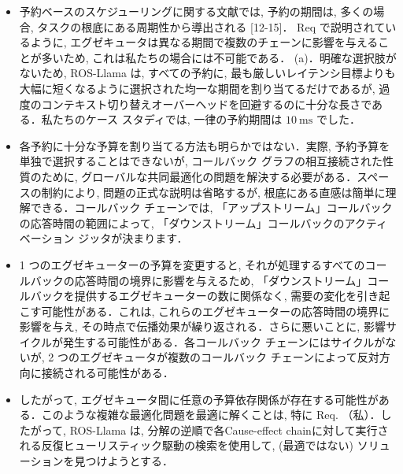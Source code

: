 \begin{frame}{}
    \begin{itemize}
        \item 予約ベースのスケジューリングに関する文献では, 予約の期間は, 多くの場合, タスクの根底にある周期性から導出される [12-15]． Req で説明されているように, エグゼキュータは異なる期間で複数のチェーンに影響を与えることが多いため, これは私たちの場合には不可能である． (a)．明確な選択肢がないため, ROS-Llama は, すべての予約に, 最も厳しいレイテンシ目標よりも大幅に短くなるように選択された均一な期間を割り当てるだけであるが, 過度のコンテキスト切り替えオーバーヘッドを回避するのに十分な長さである．私たちのケース スタディでは, 一律の予約期間は $10 \mathrm{~ms}$ でした．
    \end{itemize}
\end{frame}

\begin{frame}{}
    \begin{itemize}
        \item 各予約に十分な予算を割り当てる方法も明らかではない．実際, 予約予算を単独で選択することはできないが, コールバック グラフの相互接続された性質のために, グローバルな共同最適化の問題を解決する必要がある．スペースの制約により, 問題の正式な説明は省略するが, 根底にある直感は簡単に理解できる．コールバック チェーンでは, 「アップストリーム」コールバックの応答時間の範囲によって, 「ダウンストリーム」コールバックのアクティベーション ジッタが決まります．
    \end{itemize}
\end{frame}

\begin{frame}{}
    \begin{itemize}
        \item 1 つのエグゼキューターの予算を変更すると, それが処理するすべてのコールバックの応答時間の境界に影響を与えるため, 「ダウンストリーム」コールバックを提供するエグゼキューターの数に関係なく, 需要の変化を引き起こす可能性がある．これは, これらのエグゼキューターの応答時間の境界に影響を与え, その時点で伝播効果が繰り返される．さらに悪いことに, 影響サイクルが発生する可能性がある．各コールバック チェーンにはサイクルがないが, 2 つのエグゼキュータが複数のコールバック チェーンによって反対方向に接続される可能性がある．
    \end{itemize}
\end{frame}

\begin{frame}{}
    \begin{itemize}
        \item したがって, エグゼキュータ間に任意の予算依存関係が存在する可能性がある．このような複雑な最適化問題を最適に解くことは, 特に Req. （私）．したがって, ROS-Llama は, 分解の逆順で各Cause-effect chainに対して実行される反復ヒューリスティック駆動の検索を使用して, (最適ではない) ソリューションを見つけようとする．
    \end{itemize}
\end{frame}

